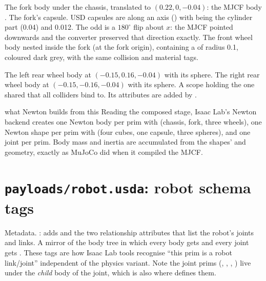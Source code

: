 \begin{explain}
 The fork body under the chassis, translated to $(0.22, 0,
  -0.04)$: the MJCF body .
 The fork's capsule. USD capsules are along an axis
  () with  being the cylinder part (0.04) and
   0.012. The odd  is a
  $180^\circ$ flip about $x$: the MJCF  pointed downwards and
  the converter preserved that direction exactly.
 The front wheel body nested inside the fork (at the fork
  origin), containing a  of radius 0.1, coloured dark grey,
  with the same collision and material tags.
\end{explain}


\begin{explain}
 The left rear wheel body at $(-0.15, 0.16, -0.04)$ with its
  sphere.
 The right rear wheel body at $(-0.15, -0.16, -0.04)$ with its
  sphere.
 A  scope holding the one shared
   that all colliders bind to. Its attributes are
  added by .
\end{explain}

\begin{isaacbox}{what Newton builds from this}
Reading the composed stage, Isaac Lab's Newton backend creates one Newton
body per prim with  (chassis, fork, three wheels),
one Newton shape per prim with  (four cubes, one
capsule, three spheres), and one joint per 
prim. Body mass and inertia are accumulated from the shapes'
 and geometry, exactly as MuJoCo did when it compiled the
MJCF.
\end{isaacbox}

\section{\texttt{payloads/robot.usda}: robot schema tags}


\begin{explain}
 Metadata.
 : adds  and the two
  relationship attributes that list the robot's joints and links.
 A mirror of the body tree in which every body gets
   and every joint gets . These tags
  are how Isaac Lab tools recognise ``this prim is a robot link/joint''
  independent of the physics variant. Note the joint prims (,
  , , ) live under the
  \emph{child} body of the joint, which is also where 
  defines them.
\end{explain}

